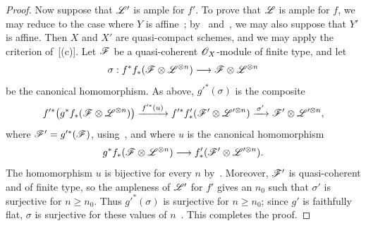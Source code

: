 \begin{proof}
Now suppose that $\mathscr{L}'$ is ample for $f'$. To prove that $\mathscr{L}$
is ample for $f$, we may reduce to the case where $Y$ is
affine~; by~
and~, we may also suppose that $Y'$ is affine.
Then $X$ and $X'$ are quasi-compact schemes, and we may apply the
criterion of~[(c)]. Let $\mathscr{F}$ be a
quasi-coherent $\mathscr{O}_X$-module of finite type, and let
\[
  \sigma:
  f^*f_*(\mathscr{F}\otimes\mathscr{L}^{\otimes n})
  \longrightarrow
  \mathscr{F}\otimes\mathscr{L}^{\otimes n}
\]
be the canonical homomorphism. As above, $g'^*(\sigma)$ is the
composite
\[
  f'^*\!\left(g^*f_*(\mathscr{F}\otimes\mathscr{L}^{\otimes n})\right)
    \xrightarrow{\,f'^*(u)\,}
  f'^*f'_*(\mathscr{F}'\otimes\mathscr{L}'^{\otimes n})
    \xrightarrow{\,\sigma'\,}
  \mathscr{F}'\otimes\mathscr{L}'^{\otimes n},
\]
where $\mathscr{F}'=g'^*(\mathscr{F})$, using~, and where
$u$ is the canonical homomorphism
\[
  g^*f_*(\mathscr{F}\otimes\mathscr{L}^{\otimes n})
  \longrightarrow
  f'_*(\mathscr{F}'\otimes\mathscr{L}'^{\otimes n}).
\]
The homomorphism $u$ is bijective for every $n$ by~.
Moreover, $\mathscr{F}'$ is quasi-coherent and of finite type, so the
ampleness of $\mathscr{L}'$ for $f'$ gives an $n_0$ such that $\sigma'$ is
surjective for $n\geq n_0$. Thus $g'^*(\sigma)$ is surjective for
$n\geq n_0$; since $g'$ is faithfully flat, $\sigma$ is surjective for
these values of $n$~. This completes the proof.
\end{proof}


